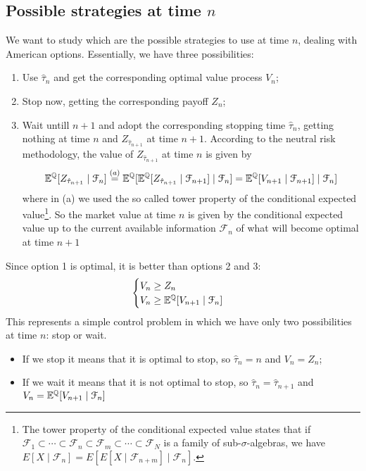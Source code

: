 \subsection{Possible strategies at time \texorpdfstring{$n$}{n}}
We want to study which are the possible strategies to use at time $n$, dealing with American options. Essentially, we have three possibilities:
\begin{enumerate}
    \item Use $\hat{\tau}_n$ and get the corresponding optimal value process $V_n$;
    \item Stop now, getting the corresponding payoff $Z_n$;
    \item Wait untill $n+1$ and adopt the corresponding stopping time $\hat{\tau}_n$, getting nothing at time $n$ and $Z_{\hat{\tau}_{n+1}}$ at time $n+1$. According to the neutral risk methodology, the value of $Z_{\hat{\tau}_{n+1}}$ at time $n$ is given by 
    \begin{equation}
        \mathbb{E}^{\mathbb{Q}}[Z_{\hat{\tau}_{n+1}}\mid\mathcal{F}_n] \overset{(a)}{=} \mathbb{E}^{\mathbb{Q}}[\mathbb{E}^{\mathbb{Q}}[Z_{\hat{\tau}_{n+1}}\mid\mathcal{F}_{n+1}]\mid\mathcal{F}_n] = \mathbb{E}^{\mathbb{Q}}[V_{n+1}\mid\mathcal{F}_{n+1}]\mid\mathcal{F}_n]
    \end{equation}
    where in (a) we used the so called tower property of the conditional expected value\footnote{The tower property of the conditional expected value states that if $\mathcal{F}_{1}\subset\cdots \subset\mathcal{F}_{n}\subset\mathcal{F}_{m}\subset\cdots\subset\mathcal{F}_{N}$ is a family of sub-$\sigma$-algebras, we have $E[X\mid\mathcal{F}_{n}] = E[E[X\mid \mathcal{F}_{n+m}]\mid\mathcal{F}_{n}]$.}. So the market value at time $n$ is given by the conditional expected value up to the current available information $\mathcal{F}_n$ of what will become optimal at time $n+1$
\end{enumerate}
Since option 1 is optimal, it is better than options 2 and 3:
\begin{equation}\label{Vndis}
    \begin{cases}
    V_n \ge Z_n \\
    V_n \ge \mathbb{E}^{\mathbb{Q}}[V_{n+1}\mid\mathcal{F}_{n}]
    \end{cases}
\end{equation}
This represents a simple control problem in which we have only two possibilities at time $n$: stop or wait.
\begin{itemize}
    \item If we stop it means that it is optimal to stop, so $\hat{\tau}_n=n$ and $V_n=Z_n$;
    \item If we wait it means that it is not optimal to stop, so $\hat{\tau}_n=\hat{\tau}_{n+1}$ and $V_n=\mathbb{E}^{\mathbb{Q}}[V_{n+1}\mid\mathcal{F}_{n}]$
\end{itemize}
